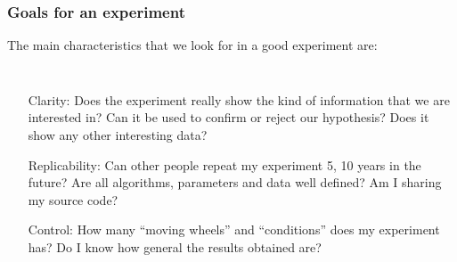 \documentclass{beamer}
\begin{document}
\begin{frame}
  \frametitle{Goals for an experiment}

  The main characteristics that we look for in a good experiment are:
  \bigskip

  \begin{columns}[c]
    {\small
      \begin{enumerate}
      \item [Clarity:] Does the experiment really show the kind of
        information that we are interested in? Can it be used to confirm
        or reject our hypothesis? Does it show any other interesting data?
      \item [Replicability:] Can other people repeat my experiment 5, 10
        years in the future? Are all algorithms, parameters and data well
        defined? Am I sharing my source code?
      \item [Control:] How many ``moving wheels'' and ``conditions'' does
        my experiment has? Do I know how general the results obtained are?
    \end{enumerate}}
  \end{columns}
\end{frame}
\end{document}
